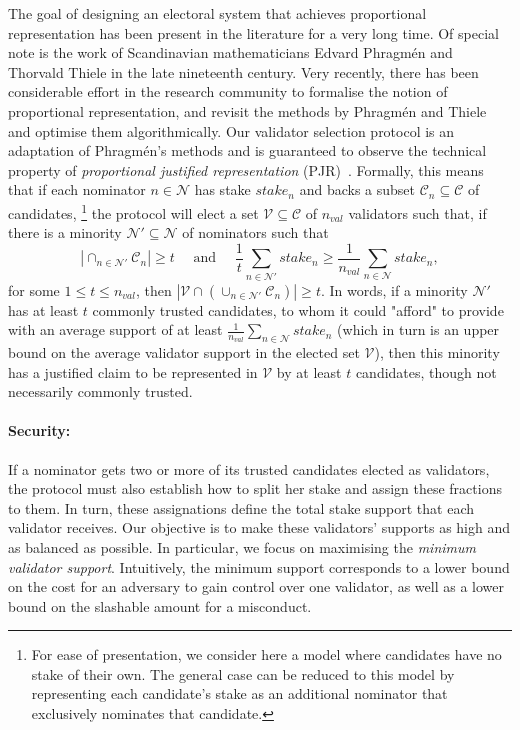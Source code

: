 \documentclass{article}
\newcommand{\Nom}{\ensuremath{\mathcal{N}}} %
\newcommand{\Val}{\ensuremath{\mathcal{V}}} %
\newcommand{\nval}{\ensuremath{n_{val}}} %
\newcommand{\Can}{\ensuremath{\mathcal{C}}} %
\newcommand{\nom}{\ensuremath{n}} %
\begin{document}
The goal of designing an electoral system that achieves proportional representation has been present in the literature for a very long time. Of special note is the work of Scandinavian mathematicians Edvard Phragm\'{e}n and Thorvald Thiele in the late nineteenth century. Very recently, there has been considerable effort in the research community to formalise the notion of proportional representation, and revisit the methods by Phragm\'{e}n and Thiele and optimise them algorithmically. 
Our validator selection protocol is an adaptation of Phragm\'{e}n's methods and is guaranteed 
to observe the technical property of \emph{proportional justified representation} (PJR)~\cite{sanchez2017proportional, brill2017phragmen}. 
Formally, this means that if each nominator $\nom \in \Nom$ has stake $stake_\nom$ 
and backs a subset $\Can_\nom\subseteq \Can$ of candidates,%
%
\footnote{For ease of presentation, we consider here a model where candidates have no stake of their own. 
	The general case can be reduced to this model by representing each candidate's stake as an additional nominator 
	that exclusively nominates that candidate.} %
%
the protocol will elect a set $\Val\subseteq \Can$ of $\nval$ validators such that, 
if there is a minority $\Nom'\subseteq \Nom$ of nominators such that %
%
$$|\cap_{\nom\in \Nom'} \Can_n| \geq t \quad \text{ and } \quad
\frac{1}{t} \sum_{\nom\in \Nom'} stake_\nom \geq \frac{1}{\nval} \sum_{\nom\in \Nom} stake_\nom,$$
%
for some $1\leq t\leq \nval$, then $|\Val\cap (\cup_{\nom\in\Nom'} \Can_n)| \geq t$.
In words, if a minority $\Nom'$ has at least $t$ commonly trusted candidates, 
to whom it could "afford" to provide with an average support of at least 
$\frac{1}{\nval} \sum_{\nom\in \Nom} stake_\nom$ 
(which in turn is an upper bound on the average validator support in the elected set $\Val$), 
then this minority has a justified claim to be represented in $\Val$ by at least $t$ candidates,  
though not necessarily commonly trusted.

\paragraph{Security:} If a nominator gets two or more of its trusted candidates elected as validators,
the protocol must also establish how to split her stake and assign these fractions to them.
In turn, these assignations define the total stake support that each validator receives.
Our objective is to make these validators' supports as high and as balanced as possible.
In particular, we focus on maximising the \emph{minimum validator support}.
Intuitively, the minimum support corresponds to a lower bound on the cost for an adversary to gain control
over one validator, as well as a lower bound on the slashable amount for a misconduct.
\end{document}
